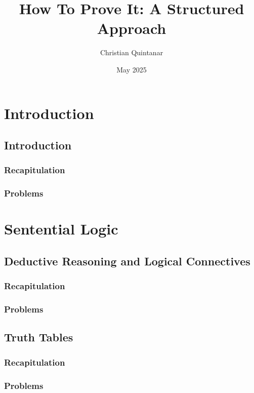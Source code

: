 \documentclass{report}
\title{How To Prove It: A Structured Approach}
\author{Christian Quintanar}
\date{May 2025}
\begin{document}
\maketitle

\chapter{Introduction}
    \section{Introduction}
        \subsection{Recapitulation}
        
        \subsection{Problems}
        
\chapter{Sentential Logic}
    \section{Deductive Reasoning and Logical Connectives}
        \subsection{Recapitulation}
        
        \subsection{Problems}
        
    \section{Truth Tables}
        \subsection{Recapitulation}
        
        \subsection{Problems}
        
\end{document}
